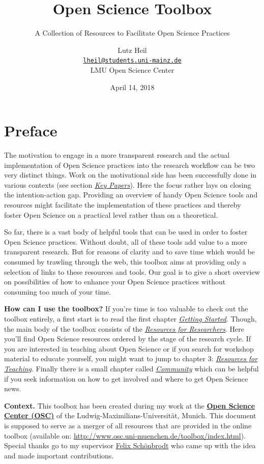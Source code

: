 \documentclass[12pt,]{report}
\title{Open Science Toolbox}
\subtitle{A Collection of Resources to Facilitate Open Science Practices}
\author{Lutz Heil \\ \href{mailto:lheil@students.uni-mainz.de}{\nolinkurl{lheil@students.uni-mainz.de}} \\ LMU Open Science Center}
\date{April 14, 2018}
\begin{document}
\maketitle

{
\setcounter{tocdepth}{1}
\tableofcontents
}
\chapter*{Preface}\label{preface}

The motivation to engage in a more transparent research and the actual
implementation of Open Science practices into the research workflow can
be two very distinct things. Work on the motivational side has been
successfully done in various contexts (see section
\protect\hyperlink{key_papers}{\emph{Key Papers}}). Here the focus
rather lays on closing the intention-action gap. Providing an overview
of handy Open Science tools and resources might facilitate the
implementation of these practices and thereby foster Open Science on a
practical level rather than on a theoretical.

So far, there is a vast body of helpful tools that can be used in order
to foster Open Science practices. Without doubt, all of these tools add
value to a more transparent research. But for reasons of clarity and to
save time which would be consumed by trawling through the web, this
toolbox aims at providing only a selection of links to these resources
and tools. Our goal is to give a short overview on possibilities of how
to enhance your Open Science practices without consuming too much of
your time.

\textbf{How can I use the toolbox?} If you're time is too valuable to
check out the toolbox entirely, a first start is to read the first
chapter \protect\hyperlink{getting_started}{\emph{Getting Started}}.
Though, the main body of the toolbox consists of the
\protect\hyperlink{res_researchers}{\emph{Resources for Researchers}}.
Here you'll find Open Science resources ordered by the stage of the
research cycle. If you are interested in teaching about Open Science or
if you search for workshop material to educate yourself, you might want
to jump to chapter 3: \protect\hyperlink{res_teaching}{\emph{Resources
for Teaching}}. Finally there is a small chapter called
\protect\hyperlink{community}{\emph{Community}} which can be helpful if
you seek information on how to get involved and where to get Open
Science news.

\textbf{Context.} This toolbox has been created during my work at the
\href{http://www.osc.uni-muenchen.de/index.html}{\textbf{Open Science
Center (OSC)}} of the Ludwig-Maximilians-Universität, Munich. This
document is supposed to serve as a merger of all resources that are
provided in the online toolbox (available on:
\url{http://www.osc.uni-muenchen.de/toolbox/index.html}). Special thanks
go to my supervisor
\href{http://www.osc.uni-muenchen.de/members/individual-members/schoenbrodt/index.html}{Felix
Schönbrodt} who came up with the idea and made important contributions.
\end{document}
